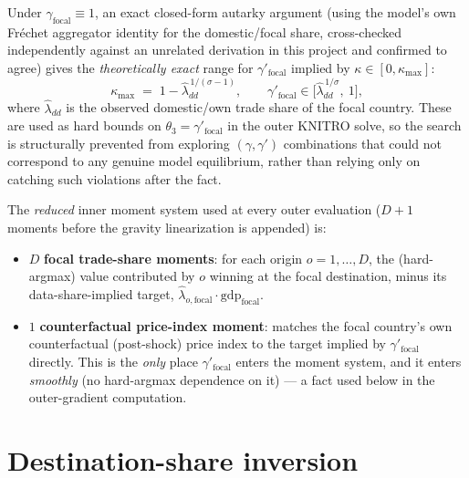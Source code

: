 \documentclass[11pt]{article}
\begin{document}
Under $\gamma_{\text{focal}}\equiv1$, an exact closed-form autarky argument (using the model's own
Fréchet aggregator identity for the domestic/focal share, cross-checked independently against an
unrelated derivation in this project and confirmed to agree) gives the \emph{theoretically exact}
range for $\gamma'_{\text{focal}}$ implied by $\kappa\in[0,\kappa_{\max}]$:
\[
\kappa_{\max} \;=\; 1-\hat\lambda_{dd}^{\,1/(\sigma-1)},
\qquad
\gamma'_{\text{focal}}\in\big[\hat\lambda_{dd}^{\,1/\sigma},\ 1\big],
\]
where $\hat\lambda_{dd}$ is the observed domestic/own trade share of the focal country. These are
used as hard bounds on $\theta_3=\gamma'_{\text{focal}}$ in the outer KNITRO solve, so the search is
structurally prevented from exploring $(\gamma,\gamma')$ combinations that could not correspond to
any genuine model equilibrium, rather than relying only on catching such violations after the fact.

The \emph{reduced} inner moment system used at every outer evaluation ($D+1$ moments before the
gravity linearization is appended) is:
\begin{itemize}
  \item $D$ \textbf{focal trade-share moments}: for each origin $o=1,\dots,D$, the (hard-argmax)
  value contributed by $o$ winning at the focal destination, minus its data-share-implied target,
  $\hat\lambda_{o,\text{focal}}\cdot\mathrm{gdp}_{\text{focal}}$.
  \item $1$ \textbf{counterfactual price-index moment}: matches the focal country's own
  counterfactual (post-shock) price index to the target implied by $\gamma'_{\text{focal}}$ directly.
  This is the \emph{only} place $\gamma'_{\text{focal}}$ enters the moment system, and it enters
  \emph{smoothly} (no hard-argmax dependence on it) — a fact used below in the outer-gradient
  computation.
\end{itemize}

\section{Destination-share inversion}
\label{sec:inversion}
\end{document}
